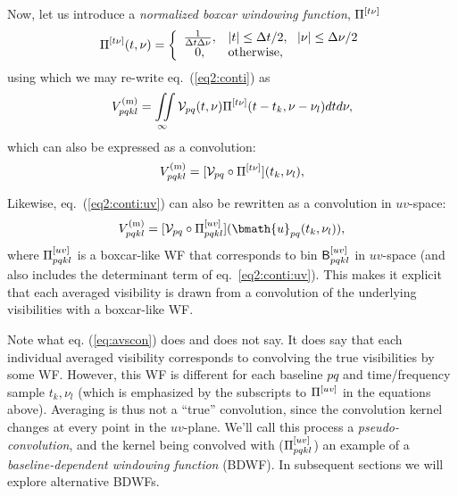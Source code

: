 \documentclass[useAMS,usenatbib]{mn2e}
\begin{document}
Now, let us introduce a \emph{normalized boxcar windowing function}, $\Pi^{[t\nu]}$ 
\begin{equation}
\Pi^{[t\nu]}(t,\nu) = \bigg \{ \begin{array}{cl}
\frac{1}{\Delta t\Delta\nu}, &  |t|\leq\Delta t/2,~~|\nu|\leq\Delta\nu/2 \\
0, & \mathrm{otherwise},
\end{array}
\end{equation}
using which we may re-write eq.~(\ref{eq2:conti}) as
\begin{equation}
V^\mathrm{(m)}_{pqkl} =  
\iint\limits_{\infty}
\mathcal{V}_{pq}(t,\nu) \Pi^{[t\nu]}(t-t_k,\nu-\nu_l) dtd\nu,
\end{equation}
which can also be expressed as a convolution:
\begin{equation}
V^\mathrm{(m)}_{pqkl} = [ \mathcal{V}_{pq} \circ \Pi^{[t\nu]} ](t_k,\nu_l),
\end{equation}

Likewise, eq.~(\ref{eq2:conti:uv}) can also be rewritten as a convolution in $uv$-space:
\begin{equation}
V^\mathrm{(m)}_{pqkl} = [ \VV_{pq} \circ \Puv_{pqkl} ](\bmath{u}_{pq}(t_k,\nu_l)),
\label{eq:avscon}
\end{equation}
where $\Pi^{[uv]}_{pqkl}$ is a boxcar-like WF that corresponds to bin $\mathsf{B}^{[uv]}_{pqkl}$ in $uv$-space 
(and also includes the determinant term of eq.~\ref{eq2:conti:uv}). This makes it explicit that each averaged 
visibility is drawn from a convolution of the underlying visibilities with a boxcar-like WF.

Note what eq. (\ref{eq:avscon}) does and does not say. It does say that each individual averaged visibility corresponds to 
convolving the true visibilities by some WF. However, this WF is different for each baseline $pq$ and 
time/frequency sample $t_k,\nu_l$ (which is emphasized by the subscripts to $\Pi^{[uv]}$ in the equations above). Averaging 
is thus not a ``true'' convolution, since the convolution kernel changes at every point in the $uv$-plane. We'll call this 
process a \emph{pseudo-convolution}, and the kernel being convolved with ($\Pi^{[uv]}_{pqkl}$) an example of a 
\emph{baseline-dependent windowing function} (BDWF). In subsequent sections we will explore alternative BDWFs.
\end{document}
